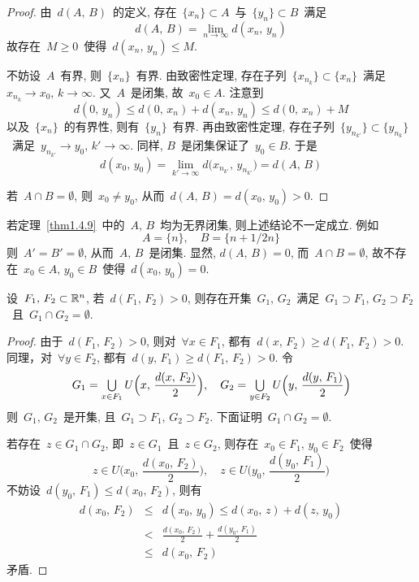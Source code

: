 \begin{proof}
由~$d(A,\,B)$~的定义, 存在~$\{x_n\} \subset A$~与~$\{y_n\} \subset B$~满足
\[
d(A,\,B) = \lim_{n \to \infty} d(x_n,\,y_n)
\]
故存在~$M \geqslant 0$~使得~$d(x_n,\,y_n) \leqslant M$.

不妨设~$A$~有界, 则~$\{x_n\}$~有界. 由致密性定理,
存在子列~$\{x_{n_k}\} \subset \{x_n\}$~满足~$x_{n_k} \rightarrow x_0, \, k \to \infty$. 又~$A$~是闭集, 故~$x_0 \in A$. 注意到
\[
d(0,\,y_n) \leqslant d(0,\,x_n) + d(x_n,\,y_n) \leqslant d(0,\,x_n) + M
\]
以及~$\{x_n\}$~的有界性, 则有~$\{y_n\}$~有界. 再由致密性定理, 存在子列~$\{y_{n_{k'}}\} \subset \{y_{n_k}\}$~满足~$y_{n_{k'}} \rightarrow y_0, \, k' \to \infty$. 同样, $B$~是闭集保证了~$y_0 \in B$. 于是
\[
d(x_0,\,y_0) = \lim_{k' \to \infty} d\big(x_{n_{k'}}, \, y_{n_{k'}}\big) = d(A,\,B)
\]

若~$A \cap B = \emptyset$, 则~$x_0 \neq y_0$, 从而~$d(A,\,B) = d(x_0,\,y_0) > 0$.
\end{proof}

\begin{remark}
若定理~\ref{thm1.4.9}~中的~$A,\,B$~均为无界闭集, 则上述结论不一定成立. 例如
\[
A = \{n\}, \quad B = \{n + 1/2n\}
\]
则~$A' = B' = \emptyset$, 从而~$A,\,B$~是闭集. 显然, $d(A,\,B) = 0$, 而~$A \cap B = \emptyset$, 故不存在~$x_0 \in A,\,y_0 \in B$~使得~$d(x_0,\,y_0) = 0$.
\end{remark}

\begin{theorem} \label{thm1.4.10}
设~$F_1,\,F_2 \subset \mathbb{R}^n$, 若~$d(F_1, \, F_2) > 0$, 则存在开集~$G_1,\,G_2$~满足~$G_1 \supset F_1,\,G_2 \supset F_2$~且~$G_1 \cap G_2 = \emptyset$.
\end{theorem}

\begin{proof}
由于~$d(F_1, \, F_2) > 0$, 则对~$\forall x \in F_1$, 都有~$d(x,\,F_2) \geqslant d(F_1,\,F_2) >0$. 同理，对~$\forall y \in F_2$, 都有~$d(y,\,F_1) \geqslant d(F_1,\,F_2) >0$. 令
\[
G_1 = \mathop{\textstyle{\bigcup}}_{x \in F_1} U\Big(x,\,\frac{d(x,\,F_2)}{2}\Big), \quad G_2 = \mathop{\textstyle{\bigcup}}_{y \in F_2} U\Big(y,\,\frac{d(y,\,F_1)}{2}\Big)
\]
则~$G_1,\,G_2$~是开集, 且~$G_1 \supset F_1,\,G_2 \supset F_2$. 下面证明~$G_1 \cap G_2 = \emptyset$.

若存在~$z \in G_1 \cap G_2$, 即~$z \in G_1$~且~$z \in G_2$, 则存在~$x_0 \in F_1,\,y_0 \in F_2$~使得
\[
z \in U\Big(x_0,\,\frac{d(x_0,\,F_2)}{2}\Big), \quad z \in U\Big(y_0,\,\frac{d(y_0,\,F_1)}{2}\Big)
\]
不妨设~$d(y_0,\,F_1) \leqslant d(x_0,\,F_2)$, 则有
\begin{eqnarray*}
d(x_0,\,F_2) &\leqslant& d(x_0,\,y_0) \leqslant d(x_0,\,z) + d(z,\,y_0) \\
&<& \frac{d(x_0,\,F_2)}{2} + \frac{d(y_0,\,F_1)}{2} \\
&\leqslant& d(x_0,\,F_2)
\end{eqnarray*}
矛盾.
\end{proof}

